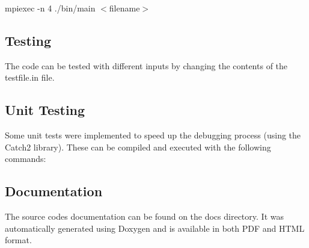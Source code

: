 {\ttfamily mpiexec -\/n 4 ./bin/main $<$filename$>$}

\subsection*{Testing}

The code can be tested with different inputs by changing the contents of the {\ttfamily testfile.\+in} file.

\subsection*{Unit Testing}

Some unit tests were implemented to speed up the debugging process (using the Catch2 library). These can be compiled and executed with the following commands\+: 
\begin{DoxyCode}{0}
\end{DoxyCode}


\subsection*{Documentation}

The source code\textquotesingle{}s documentation can be found on the {\ttfamily docs} directory. It was automatically generated using Doxygen and is available in both P\+DF and H\+T\+ML format. 